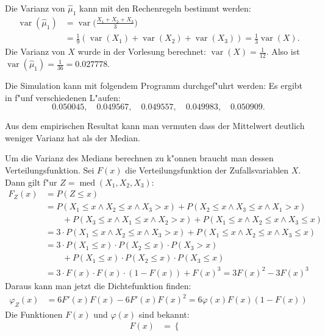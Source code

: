 \begin{loesung}
\begin{teilaufgaben}
\item Die Varianz von $\hat\mu_1$ kann mit den Rechenregeln bestimmt werden:
\begin{align*}
\operatorname{var}(\hat\mu_1)&=\operatorname{var}\biggl(\frac{X_1+X_2+X_3}3\biggr)
\\
&=\frac19(
\operatorname{var}(X_1)+
\operatorname{var}(X_2)+
\operatorname{var}(X_3)
)
=\frac13\operatorname{var}(X).
\end{align*}
Die Varianz von $X$ wurde in der Vorlesung berechnet:
$\operatorname{var}(X)=\frac1{12}$. Also ist
$\operatorname{var}(\hat\mu_1)=\frac1{36}=0.027778$.
\item Die Simulation kann mit folgendem Programm durchgef"uhrt werden:
Es ergibt in f"unf verschiedenen L"aufen:
\[
0.050045,\quad
0.049567,\quad
0.049557,\quad
0.049983,\quad
0.050909.
\]
\item
Aus dem empirischen Resultat kann man vermuten dass der Mittelwert
deutlich weniger Varianz hat als der Median.
\item
Um die Varianz des Medians berechnen zu k"onnen braucht man dessen
Verteilungsfunktion.
Sei $F(x)$ die Verteilungsfunktion der Zufallsvariablen $X$.
Dann gilt f"ur $Z=\operatorname{med}(X_1,X_2,X_3)$:
\begin{align*}
F_Z(x)&=P(Z\le x)\\
&=P(X_1\le x\wedge X_2\le x\wedge X_3 > x)
+P(X_2\le x\wedge X_3\le x\wedge X_1 > x)\\
&\qquad+P(X_3\le x\wedge X_1\le x\wedge X_2 > x)
+ P(X_1\le x\wedge X_2\le x\wedge X_3\le x)\\
&=3\cdot P(X_1\le x\wedge X_2\le x\wedge X_3 > x) 
+ P(X_1\le x\wedge X_2\le x\wedge X_3\le x)\\
&=3\cdot P(X_1\le x)\cdot P(X_2\le x)\cdot P(X_3 > x)\\
&\qquad
+P(X_1\le x)\cdot P(X_2\le x)\cdot P(X_3\le x)\\
&=3\cdot F(x)\cdot F(x)\cdot (1-F(x))+F(x)^3=3F(x)^2-3F(x)^3
\end{align*}
Daraus kann man jetzt die Dichtefunktion finden:
\begin{align*}
\varphi_Z(x)
&=
6F'(x)F(x)-6F'(x)F(x)^2=6\varphi(x)F(x)(1-F(x))
\end{align*}
Die Funktionen $F(x)$ und $\varphi(x)$ sind bekannt:
\begin{align*}
F(x)&=\begin{cases}

\end{cases}
\end{align*}
\end{teilaufgaben}
\end{loesung}

